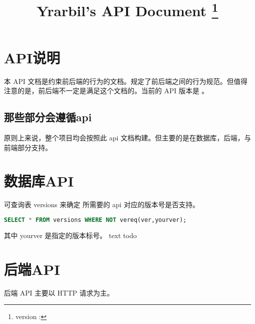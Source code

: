 \documentclass[UTF8]{ctexart}
\title{Yrarbil's API Document \thanks{version : \apiver}}
\begin{document}
    \maketitle
    \newpage
    
    \tableofcontents
    \newpage
    \section{API说明}
    本 API 文档是约束前后端的行为的文档。规定了前后端之间的行为规范。但值得注意的是，前后端不一定是满足这个文档的。当前的 API 版本是 \apiver 。
    \subsection{那些部分会遵循api}
    原则上来说，整个项目均会按照此 api 文档构建。但主要的是在数据库，后端，与前端部分支持。
    
    
    \section{数据库API}
     可查询表 versions 来确定 所需要的 api 对应的版本号是否支持。
    \begin{lstlisting}[language=SQL]
SELECT * FROM versions WHERE NOT vereq(ver,yourver);
    \end{lstlisting}
    其中 yourver 是指定的版本标号。
     text todo
    
    \section{后端API}
    后端 API 主要以 HTTP 请求为主。
\end{document}
